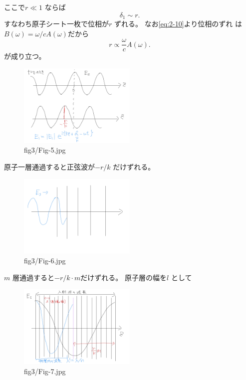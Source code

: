 \documentclass[dvipdfmx,12pt]{jsarticle}
\begin{document}
ここで$r\ll 1$ ならば
\begin{equation}
\label{eq:3-21}
	\delta_1\sim r
.\end{equation}
すなわち原子シート一枚で位相が$r$ ずれる。
なお\eqref{eq:2-10}より位相のずれ
は$B(\omega)=\omega /c A(\omega)$だから
\begin{equation}
\label{eq:3-22}
r \propto \frac{\omega}{c}A(\omega)
.\end{equation}
が成り立つ。
\begin{figure}[H]
	\centering
	\includegraphics[width=0.5\textwidth]{fig3/Fig-5.jpg}
	\caption{fig3/Fig-5.jpg}
	\label{fig:fig3-Fig-5-jpg}
\end{figure}
原子一層通過すると正弦波が$-r /k$ だけずれる。
\begin{figure}[H]
	\centering
	\includegraphics[width=0.5\textwidth]{fig3/Fig-6.jpg}
	\caption{fig3/Fig-6.jpg}
	\label{fig:fig3-Fig-6-jpg}
\end{figure}
$m$ 層通過すると$-r /k \cdot m$だけずれる。
原子層の幅を$l$ として
\begin{figure}[H]
	\centering
	\includegraphics[width=0.5\textwidth]{fig3/Fig-7.jpg}
	\caption{fig3/Fig-7.jpg}
	\label{fig:fig3-Fig-7-jpg}
\end{figure}
\end{document}
